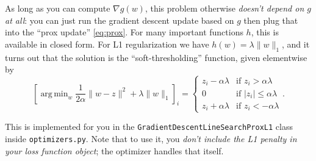 \documentclass{article}
\DeclareMathOperator*{\argmin}{arg\,min}
\newcommand{\norm}[1]{\lVert #1 \rVert}
\begin{document}
{    As long as you can compute $\nabla g(w)$, this problem otherwise \emph{doesn't depend on $g$ at all}:
    you can just run the gradient descent update based on $g$ then plug that into the ``prox update'' \eqref{eq:prox}.
    For many important functions $h$, this is available in closed form.
    For L1 regularization we have $h(w) = \lambda \norm{w}_1$,
    and it turns out that the solution is the ``soft-thresholding'' function,
    given elementwise by
    \[
        \left[ \argmin_w \frac{1}{2 \alpha} \norm{w - z}^2 + \lambda \norm{w}_1 \right]_i
        = \begin{cases}
            z_i - \alpha \lambda & \text{if } z_i > \alpha \lambda \\
            0                    & \text{if } \lvert z_i \rvert \le \alpha \lambda \\
            z_i + \alpha \lambda & \text{if } z_i < -\alpha \lambda
        \end{cases}
    .\]
}

This is implemented for you in the \verb|GradientDescentLineSearchProxL1| class inside \verb|optimizers.py|.
Note that to use it, you \emph{don't include the L1 penalty in your loss function object};
the optimizer handles that itself.
\end{document}
